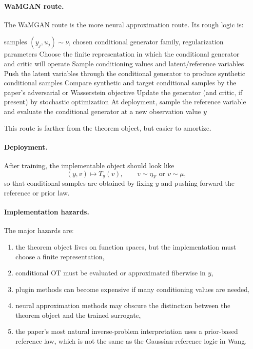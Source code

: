 \documentclass[11pt]{report}
\begin{document}
\paragraph{WaMGAN route.}
The WaMGAN route is the more neural approximation route.  Its rough logic is:
\begin{algorithm}[ht]
\caption{Conditional WaMGAN-style transport training}
\begin{algorithmic}[1]
\Require samples $(y_j,u_j)\sim\nu$, chosen conditional generator family, regularization parameters
\State Choose the finite representation in which the conditional generator and critic will operate
\State Sample conditioning values and latent/reference variables
\State Push the latent variables through the conditional generator to produce synthetic conditional samples
\State Compare synthetic and target conditional samples by the paper's adversarial or Wasserstein objective
\State Update the generator (and critic, if present) by stochastic optimization
\State At deployment, sample the reference variable and evaluate the conditional generator at a new observation value $y$
\end{algorithmic}
\end{algorithm}
This route is farther from the theorem object, but easier to amortize.

\paragraph{Deployment.}
After training, the implementable object should look like
\begin{equation}
(y,v) \longmapsto T_y(v),
\qquad
v\sim \eta_{\mathcal V} \text{ or } v\sim \mu,
\label{eq:hosseini-deployment-object}
\end{equation}
so that conditional samples are obtained by fixing $y$ and pushing forward the
reference or prior law.

\paragraph{Implementation hazards.}
The major hazards are:
\begin{enumerate}[label=(\roman*)]
  \item the theorem object lives on function spaces, but the implementation must choose a finite representation,
  \item conditional OT must be evaluated or approximated fiberwise in $y$,
  \item plugin methods can become expensive if many conditioning values are needed,
  \item neural approximation methods may obscure the distinction between the theorem object and the trained surrogate,
  \item the paper's most natural inverse-problem interpretation uses a prior-based reference law, which is not the same as the Gaussian-reference logic in Wang.
\end{enumerate}
\end{document}
